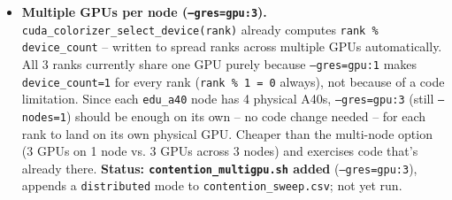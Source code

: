 \begin{itemize}
\item \textbf{Multiple GPUs per node (\texttt{--gres=gpu:3}).} \texttt{cuda\_colorizer\_select\_device(rank)} already computes \texttt{rank \% device\_count} -- written to spread ranks across multiple GPUs automatically. All 3 ranks currently share one GPU purely because \texttt{--gres=gpu:1} makes \texttt{device\_count=1} for every rank (\texttt{rank \% 1 = 0} always), not because of a code limitation. Since each \texttt{edu\_a40} node has 4 physical A40s, \texttt{--gres=gpu:3} (still \texttt{--nodes=1}) should be enough on its own -- no code change needed -- for each rank to land on its own physical GPU. Cheaper than the multi-node option (3 GPUs on 1 node vs. 3 GPUs across 3 nodes) and exercises code that's already there. \textbf{Status: \texttt{contention\_multigpu.sh} added} (\texttt{--gres=gpu:3}), appends a \texttt{distributed} mode to \texttt{contention\_sweep.csv}; not yet run.
\end{itemize}


